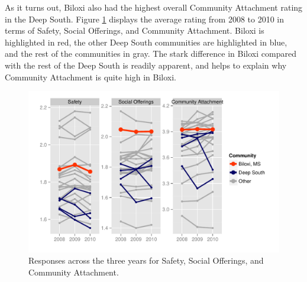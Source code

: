 \documentclass[11pt]{article}\usepackage{knitr}
\begin{document}
As it turns out, Biloxi also had the highest overall Community Attachment rating in the Deep South. Figure \ref{fig:ds_one} displays the average rating from 2008 to 2010 in terms of Safety, Social Offerings, and Community Attachment. Biloxi is highlighted in red, the other Deep South communities are highlighted in blue, and the rest of the communities in gray. The stark difference in Biloxi compared with the rest of the Deep South is readily apparent, and helps to explain why Community Attachment is quite high in Biloxi.

\begin{knitrout}
\color{fgcolor}\begin{figure}[H]


{\centering \includegraphics[width=\maxwidth]{figure/ds_one} 

}

\caption[Responses across the three years for Safety, Social Offerings, and Community Attachment]{Responses across the three years for Safety, Social Offerings, and Community Attachment.\label{fig:ds_one}}
\end{figure}


\end{knitrout}
\end{document}
